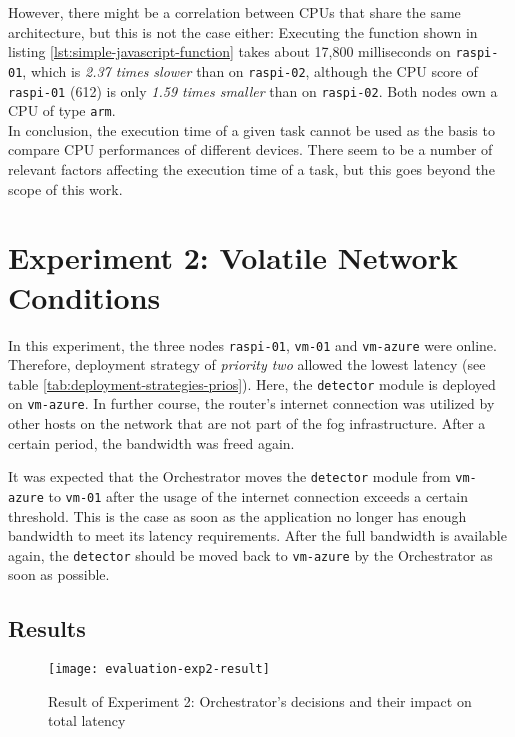 However, there might be a correlation between CPUs that share the same architecture, but this is not the case either:
Executing the function shown in listing \ref{lst:simple-javascript-function} takes about 17,800 milliseconds on \texttt{raspi-01}, which is \textit{2.37 times slower} than on \texttt{raspi-02}, although the CPU score of \texttt{raspi-01} (612) is only \textit{1.59 times smaller} than on \texttt{raspi-02}. Both nodes own a CPU of type \texttt{arm}.\\

In conclusion, the execution time of a given task cannot be used as the basis to compare CPU performances of different devices.
There seem to be a number of relevant factors affecting the execution time of a task, but this goes beyond the scope of this work.




\section{Experiment 2: Volatile Network Conditions}

In this experiment, the three nodes \texttt{raspi-01}, \texttt{vm-01} and \texttt{vm-azure} were online. Therefore, deployment strategy of \textit{priority two} allowed the lowest latency (see table \ref{tab:deployment-strategies-prios}).
Here, the \texttt{detector} module is deployed on \texttt{vm-azure}.
In further course, the router's internet connection was utilized by other hosts on the network that are not part of the fog infrastructure.
After a certain period, the bandwidth was freed again.


It was expected that the Orchestrator moves the \texttt{detector} module from \texttt{vm-azure} to \texttt{vm-01} after the usage of the internet connection exceeds a certain threshold.
This is the case as soon as the application no longer has enough bandwidth to meet its latency requirements.
After the full bandwidth is available again, the \texttt{detector} should be moved back to \texttt{vm-azure} by the Orchestrator as soon as possible.


\subsection*{Results}

\begin{figure}[htb]
    \centering
    \texttt{[image: evaluation-exp2-result]}
    \caption{Result of Experiment 2: Orchestrator's decisions and their impact on total latency}
    \label{fig:evaluation-exp2-results}
\end{figure}

